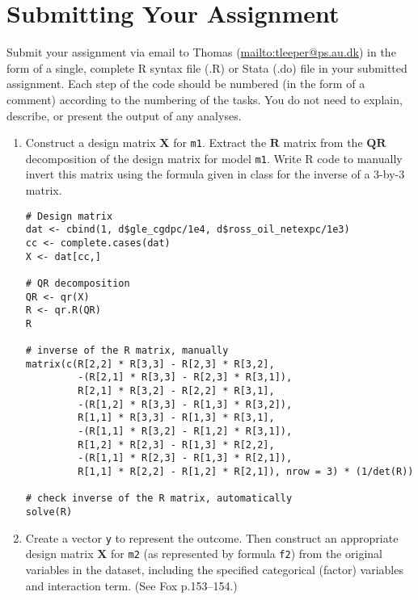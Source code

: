 \documentclass[a4paper,12pt]{article}
\newcommand{\matr}[1]{\mathbf{#1}}
\begin{document}
\section*{Submitting Your Assignment}

\noindent Submit your assignment via email to Thomas (\url{mailto:tleeper@ps.au.dk}) in the form of a single, complete R syntax file (.R) or Stata (.do) file in your submitted assignment. Each step of the code should be numbered (in the form of a comment) according to the numbering of the tasks. You do not need to explain, describe, or present the output of any analyses.


\clearpage

\doublespacing

\begin{enumerate}

\section{Ordinary Least Squares Regression}

\item Construct a design matrix $\matr{X}$ for \texttt{m1}. Extract the $\matr{R}$ matrix from the $\matr{Q}\matr{R}$ decomposition of the design matrix for model \texttt{m1}. Write R code to manually invert this matrix using the formula given in class for the inverse of a 3-by-3 matrix.

\begin{solution}
\begin{lstlisting}
# Design matrix
dat <- cbind(1, d$gle_cgdpc/1e4, d$ross_oil_netexpc/1e3)
cc <- complete.cases(dat)
X <- dat[cc,]

# QR decomposition
QR <- qr(X)
R <- qr.R(QR)
R

# inverse of the R matrix, manually
matrix(c(R[2,2] * R[3,3] - R[2,3] * R[3,2],
         -(R[2,1] * R[3,3] - R[2,3] * R[3,1]),
         R[2,1] * R[3,2] - R[2,2] * R[3,1],
         -(R[1,2] * R[3,3] - R[1,3] * R[3,2]),
         R[1,1] * R[3,3] - R[1,3] * R[3,1],
         -(R[1,1] * R[3,2] - R[1,2] * R[3,1]),
         R[1,2] * R[2,3] - R[1,3] * R[2,2],
         -(R[1,1] * R[2,3] - R[1,3] * R[2,1]),
         R[1,1] * R[2,2] - R[1,2] * R[2,1]), nrow = 3) * (1/det(R))

# check inverse of the R matrix, automatically
solve(R)
\end{lstlisting}
\end{solution}

\item Create a vector \texttt{y} to represent the outcome. Then construct an appropriate design matrix $\matr{X}$ for \texttt{m2} (as represented by formula \texttt{f2}) from the original variables in the dataset, including the specified categorical (factor) variables and interaction term. (See Fox p.153--154.)


\end{enumerate}
\end{document}
